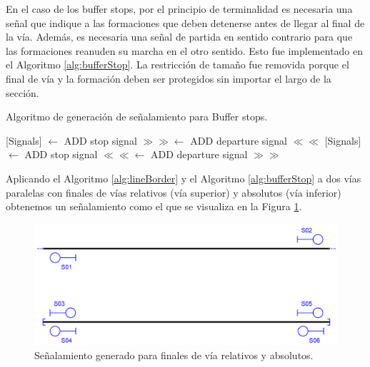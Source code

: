     En el caso de los buffer stops, por el principio de terminalidad es necesaria una señal que indique a las formaciones que deben detenerse antes de llegar al final de la vía. Además, es necesaria una señal de partida en sentido contrario para que las formaciones reanuden su marcha en el otro sentido. Esto fue implementado en el Algoritmo \ref{alg:bufferStop}. La restricción de tamaño fue removida porque el final de vía y la formación deben ser protegidos sin importar el largo de la sección.
    
    \begin{algorithm}[hbt!]
        \caption{Algoritmo de generación de señalamiento para Buffer stops.}\label{alg:bufferStop}
        \DontPrintSemicolon
        \SetNoFillComment
        \LinesNotNumbered 
        {
            {
                [Signals] $\gets$ ADD stop signal $\gg\gg$\;
                [Signals] $\gets$ ADD departure signal $\ll\ll$\;
            }
            {
                [Signals] $\gets$ ADD stop signal $\ll\ll$\;
                [Signals] $\gets$ ADD departure signal $\gg\gg$\;
            }
        }
        \KwResult{[Signals]} 
    \end{algorithm}
    
    Aplicando el Algoritmo \ref{alg:lineBorder} y el Algoritmo \ref{alg:bufferStop} a dos vías paralelas con finales de vías relativos (vía superior) y absolutos (vía inferior) obtenemos un señalamiento como el que se visualiza en la Figura \ref{fig:signal_border}.
    
    \begin{figure}[h!]
        \centering
        \includegraphics[width=1\textwidth]{Figuras/limites.PNG}
        \centering\caption{Señalamiento generado para finales de vía relativos y absolutos.}
        \label{fig:signal_border}
    \end{figure}
    
